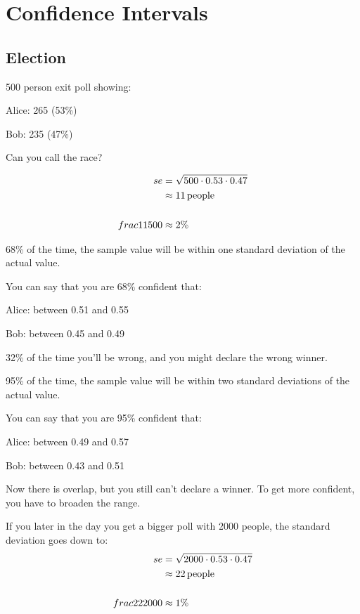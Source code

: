 \documentclass[landscape]{exam}
\begin{document}
  \section{Confidence Intervals}

  \subsection{Election}

  500 person exit poll showing:
  \begin{itemize*}
    \item Alice: 265 (53\%)
    \item Bob: 235 (47\%)
  \end{itemize*}

  Can you call the race?

  \begin{align*}
    se & = \sqrt{500 \cdot 0.53 \cdot 0.47} \\
       & \approx \unit[11]{people} \\
       \\
    frac{11}{500} &\approx 2\%
  \end{align*}

  68\% of the time, the sample value will be within one standard deviation of
  the actual value. 
  
  You can say that you are 68\% confident that:
  \begin{itemize*}
    \item Alice: between 0.51 and 0.55
    \item Bob: between 0.45 and 0.49
  \end{itemize*}

  32\% of the time you'll be wrong, and you might declare the wrong winner.

  95\% of the time, the sample value will be within two standard deviations of
  the actual value. 
  
  You can say that you are 95\% confident that:
  \begin{itemize*}
    \item Alice: between 0.49 and 0.57
    \item Bob: between 0.43 and 0.51
  \end{itemize*}

  Now there is overlap, but you still can't declare a winner. To get more
  confident, you have to broaden the range.

  If you later in the day you get a bigger poll with 2000 people, the standard
  deviation goes down to:
  \begin{align*}
    se & = \sqrt{2000 \cdot 0.53 \cdot 0.47} \\
       & \approx \unit[22]{people} \\
       \\
    frac{22}{2000} &\approx 1\%
  \end{align*}
\end{document}
